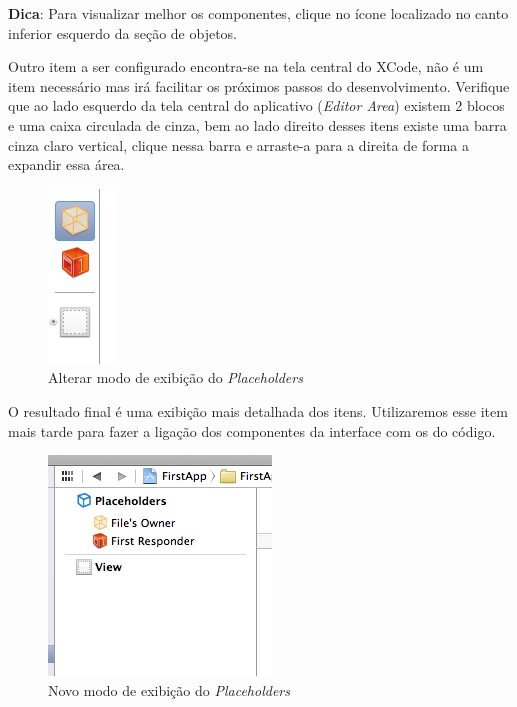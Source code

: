\documentclass[a4paper,12pt,brazil,oneside]{book}
\begin{document}
\begin{framed}

\textbf{Dica}: Para visualizar melhor os componentes, clique no ícone localizado no canto inferior esquerdo da seção de objetos.
\end{framed}

Outro item a ser configurado encontra-se na tela central do XCode, não é um item necessário mas irá facilitar os próximos passos do desenvolvimento. Verifique que ao lado esquerdo da tela central do aplicativo (\emph{Editor Area}) existem 2 blocos e uma caixa circulada de cinza, bem ao lado direito desses itens existe uma barra cinza claro vertical, clique nessa barra e arraste-a para a direita de forma a expandir essa área.

\begin{figure}[H]
  \centering
  \includegraphics[scale=0.5]{figuras/3/tela_novo_projeto_14.png}
  \caption{Alterar modo de exibição do \emph{Placeholders}}
  \label{fig:a}
\end{figure}


O resultado final é uma exibição mais detalhada dos itens. Utilizaremos esse item mais tarde para fazer a ligação dos componentes da interface com os do código.

\begin{figure}[H]
  \centering
  \includegraphics[scale=0.7]{figuras/3/tela_novo_projeto_15.png}
  \caption{Novo modo de exibição do \emph{Placeholders}}
  \label{fig:a}
\end{figure}
\end{document}
